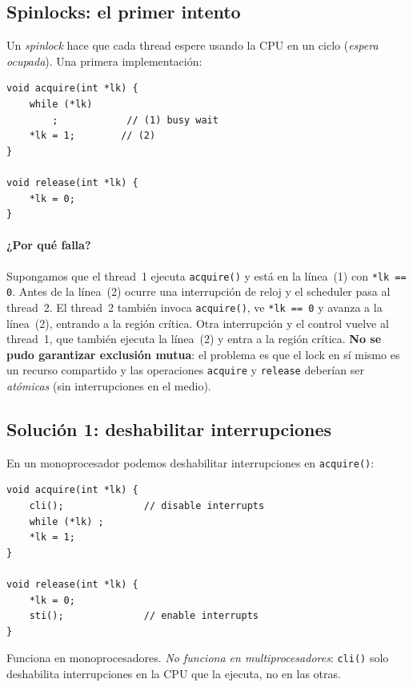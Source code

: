 \documentclass[11pt,a4paper]{article}
\begin{document}
\subsection{Spinlocks: el primer intento}

Un \emph{spinlock} hace que cada thread espere usando la CPU en un
ciclo (\emph{espera ocupada}). Una primera implementación:

\begin{lstlisting}[style=cstyle]
void acquire(int *lk) {
    while (*lk)
        ;            // (1) busy wait
    *lk = 1;        // (2)
}

void release(int *lk) {
    *lk = 0;
}
\end{lstlisting}

\paragraph{¿Por qué falla?} Supongamos que el thread~1 ejecuta
\texttt{acquire()} y está en la línea~(1) con \texttt{*lk == 0}.
Antes de la línea~(2) ocurre una interrupción de reloj y el scheduler
pasa al thread~2. El thread~2 también invoca \texttt{acquire()}, ve
\texttt{*lk == 0} y avanza a la línea~(2), entrando a la región
crítica. Otra interrupción y el control vuelve al thread~1, que
también ejecuta la línea~(2) y entra a la región crítica. \textbf{No
se pudo garantizar exclusión mutua}: el problema es que el lock en
sí mismo es un recurso compartido y las operaciones \texttt{acquire}
y \texttt{release} deberían ser \emph{atómicas} (sin interrupciones
en el medio).

\subsection{Solución 1: deshabilitar interrupciones}

En un monoprocesador podemos deshabilitar interrupciones en
\texttt{acquire()}:

\begin{lstlisting}[style=cstyle]
void acquire(int *lk) {
    cli();              // disable interrupts
    while (*lk) ;
    *lk = 1;
}

void release(int *lk) {
    *lk = 0;
    sti();              // enable interrupts
}
\end{lstlisting}

Funciona en monoprocesadores. \emph{No funciona en multiprocesadores}:
\texttt{cli()} solo deshabilita interrupciones en la CPU que la
ejecuta, no en las otras.
\end{document}
